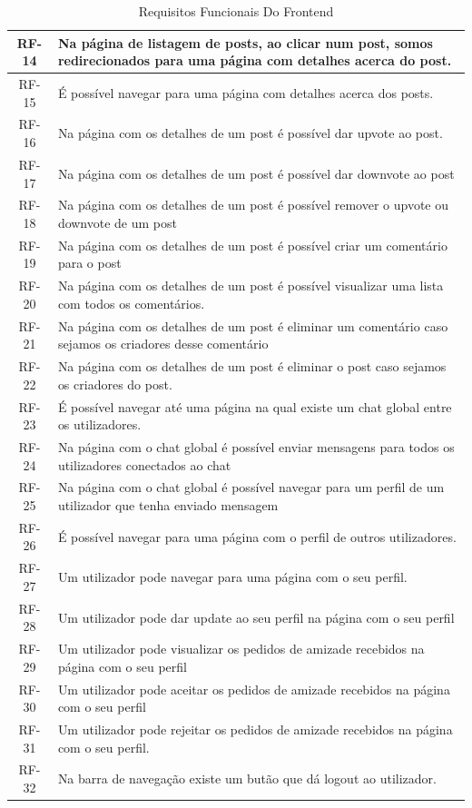 \documentclass{article}
\begin{document}
\begin{table}[H]
\begin{tabular}{|c|p{14cm}|}
			\hline 
			RF-14 & Na página de listagem de posts, ao clicar num post, somos redirecionados para uma página com detalhes acerca do post. \\
			\hline
			RF-15 & É possível navegar para uma página com detalhes acerca dos posts. \\
			\hline
			RF-16 & Na página com os detalhes de um post é possível dar upvote ao post. \\
			\hline
			RF-17 & Na página com os detalhes de um post é possível dar downvote ao post \\
			\hline
			RF-18 & Na página com os detalhes de um post é possível remover o upvote ou downvote de um post \\
			\hline
			RF-19 & Na página com os detalhes de um post é possível criar um comentário para o post \\
			\hline
			RF-20 & Na página com os detalhes de um post é possível visualizar uma lista com todos os comentários.\\
			\hline
			RF-21 & Na página com os detalhes de um post é eliminar um comentário caso sejamos os criadores desse comentário\\
			\hline
			RF-22 & Na página com os detalhes de um post é eliminar o post caso sejamos os criadores do post. \\
			\hline
			RF-23 & É possível navegar até uma página na qual existe um chat global entre os utilizadores. \\
			\hline
			RF-24 & Na página com o chat global é possível enviar mensagens para todos os utilizadores conectados ao chat \\
			\hline
			RF-25 & Na página com o chat global é possível navegar para um perfil de um utilizador que tenha enviado mensagem \\
			\hline
			RF-26 & É possível navegar para uma página com o perfil de outros utilizadores. \\
			\hline 
			RF-27 & Um utilizador pode navegar para uma página com o seu perfil. \\
			\hline 
			RF-28 & Um utilizador pode dar update ao seu perfil na página com o seu perfil \\
			\hline 
			RF-29 & Um utilizador pode visualizar os pedidos de amizade recebidos na página com o seu perfil \\
			\hline 
			RF-30 & Um utilizador pode aceitar os pedidos de amizade recebidos na página com o seu perfil \\
			\hline 
			RF-31 & Um utilizador pode rejeitar os pedidos de amizade recebidos na página com o seu perfil.\\
			\hline 
			RF-32 & Na barra de navegação existe um butão que dá logout ao utilizador.\\
			\hline 
		\end{tabular}
		\caption{Requisitos Funcionais Do Frontend}
	\end{table}
\end{document}
